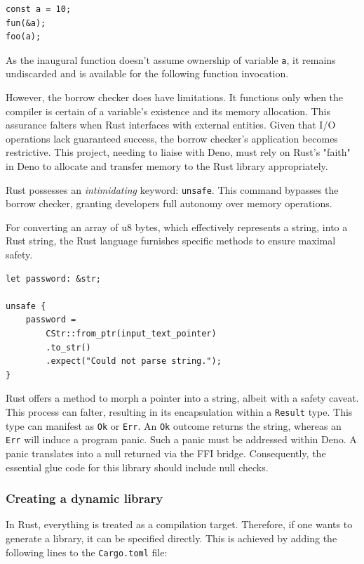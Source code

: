 \documentclass[10pt,journal,compsoc]{IEEEtran}
\begin{document}
\begin{lstlisting}
const a = 10;
fun(&a);
foo(a);
\end{lstlisting}

As the inaugural function doesn't assume ownership of variable \verb|a|, it remains undiscarded and is available for the following function invocation.

However, the borrow checker does have limitations. It functions only when the compiler is certain of a variable's existence and its memory allocation. This assurance falters when Rust interfaces with external entities. Given that I/O operations lack guaranteed success, the borrow checker's application becomes restrictive. This project, needing to liaise with Deno, must rely on Rust's "faith" in Deno to allocate and transfer memory to the Rust library appropriately.

Rust possesses an \textit{intimidating} keyword: \verb|unsafe|. This command bypasses the borrow checker, granting developers full autonomy over memory operations.

For converting an array of u8 bytes, which effectively represents a string, into a Rust string, the Rust language furnishes specific methods to ensure maximal safety.

\begin{lstlisting}
let password: &str;

unsafe {
    password = 
        CStr::from_ptr(input_text_pointer)
        .to_str()
        .expect("Could not parse string.");
}
\end{lstlisting}

Rust offers a method to morph a pointer into a string, albeit with a safety caveat. This process can falter, resulting in its encapsulation within a \verb|Result| type. This type can manifest as \verb|Ok| or \verb|Err|. An \verb|Ok| outcome returns the string, whereas an \verb|Err| will induce a program panic. Such a panic must be addressed within Deno. A panic translates into a null returned via the FFI bridge. Consequently, the essential glue code for this library should include null checks.

\subsubsection{Creating a dynamic library}

In Rust, everything is treated as a compilation target. Therefore, if one wants to generate a library, it can be specified directly. This is achieved by adding the following lines to the \verb|Cargo.toml| file:
\end{document}
